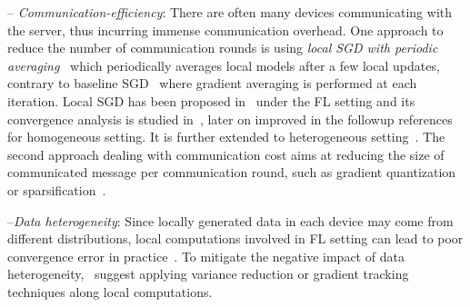 \documentclass[sigconf, anonymous, review]{acmart}
\begin{document}
-- \emph{Communication-efficiency}: There are often many devices communicating with the server, thus incurring immense communication overhead. 
One approach to reduce the number of communication rounds is using \emph{local SGD with periodic averaging}~\citep{zhou2018convergence,stich2019local,yu2019parallel,wang2018cooperative} which periodically averages local models after a few local updates, contrary to baseline SGD~\citep{bottou-bousquet-2008} where gradient averaging is performed at each iteration.
Local SGD has been proposed in~\cite{mcmahan2016communication,konevcny2016federated} under the FL setting and its convergence analysis is studied in~\cite{stich2019local,wang2018cooperative,zhou2018convergence,yu2019parallel}, later on improved in the followup references~\citep{basu2019qsparse,haddadpour2019convergence,bayoumi2020tighter,stich2019error} for homogeneous setting. 
It is further extended to heterogeneous setting~\citep{sahu2018convergence,haddadpour2019convergence,karimireddy2019scaffold,yu2019linear,li2019convergence,liang2019variance}. The second approach dealing with communication cost aims at reducing the size of communicated message per communication round, such as gradient quantization~\citep{alistarh2017qsgd,bernstein2018signsgd,tang2018communication,wen2017terngrad,wu2018error} or sparsification~\citep{stich2018sparsified,alistarh2018convergence,lin2017deep,stich2019error}. 


--\emph{Data heterogeneity}: 
Since locally generated data in each device may come from different distributions, local computations involved in FL setting can lead to poor convergence error in practice~\citep{li2019federated,liang2019variance}. 
To mitigate the negative impact of data heterogeneity,~\cite{horvath2019stochastic,liang2019variance,karimireddy2019scaffold,haddadpour2020federated} suggest applying variance reduction or gradient tracking techniques along local computations.
\end{document}
